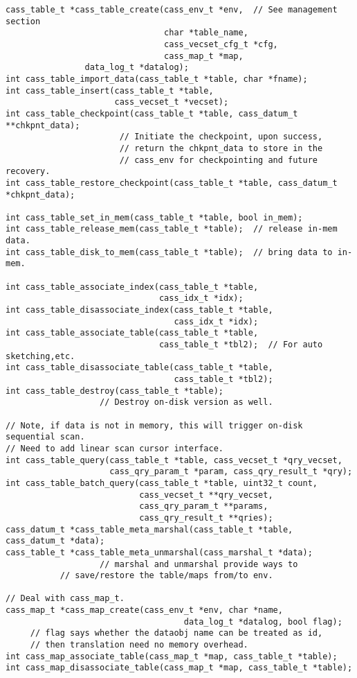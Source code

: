 \begin{verbatim}
cass_table_t *cass_table_create(cass_env_t *env,  // See management section
                                char *table_name,
                                cass_vecset_cfg_t *cfg, 
                                cass_map_t *map,
				data_log_t *datalog);
int cass_table_import_data(cass_table_t *table, char *fname); 
int cass_table_insert(cass_table_t *table,
                      cass_vecset_t *vecset);
int cass_table_checkpoint(cass_table_t *table, cass_datum_t **chkpnt_data);
                       // Initiate the checkpoint, upon success,
                       // return the chkpnt_data to store in the
                       // cass_env for checkpointing and future recovery.
int cass_table_restore_checkpoint(cass_table_t *table, cass_datum_t *chkpnt_data);
 
int cass_table_set_in_mem(cass_table_t *table, bool in_mem);
int cass_table_release_mem(cass_table_t *table);  // release in-mem data.
int cass_table_disk_to_mem(cass_table_t *table);  // bring data to in-mem.

int cass_table_associate_index(cass_table_t *table, 
                               cass_idx_t *idx);
int cass_table_disassociate_index(cass_table_t *table, 
                                  cass_idx_t *idx);
int cass_table_associate_table(cass_table_t *table, 
                               cass_table_t *tbl2);  // For auto sketching,etc.
int cass_table_disassociate_table(cass_table_t *table, 
                                  cass_table_t *tbl2);
int cass_table_destroy(cass_table_t *table);
                   // Destroy on-disk version as well.

// Note, if data is not in memory, this will trigger on-disk sequential scan.
// Need to add linear scan cursor interface.
int cass_table_query(cass_table_t *table, cass_vecset_t *qry_vecset, 
                     cass_qry_param_t *param, cass_qry_result_t *qry);
int cass_table_batch_query(cass_table_t *table, uint32_t count,
                           cass_vecset_t **qry_vecset,
                           cass_qry_param_t **params,
                           cass_qry_result_t **qries);
cass_datum_t *cass_table_meta_marshal(cass_table_t *table, cass_datum_t *data);
cass_table_t *cass_table_meta_unmarshal(cass_marshal_t *data); 
                   // marshal and unmarshal provide ways to
		   // save/restore the table/maps from/to env.

// Deal with cass_map_t.
cass_map_t *cass_map_create(cass_env_t *env, char *name, 
                                    data_log_t *datalog, bool flag);
     // flag says whether the dataobj name can be treated as id, 
     // then translation need no memory overhead.
int cass_map_associate_table(cass_map_t *map, cass_table_t *table);
int cass_map_disassociate_table(cass_map_t *map, cass_table_t *table);


\end{verbatim}
